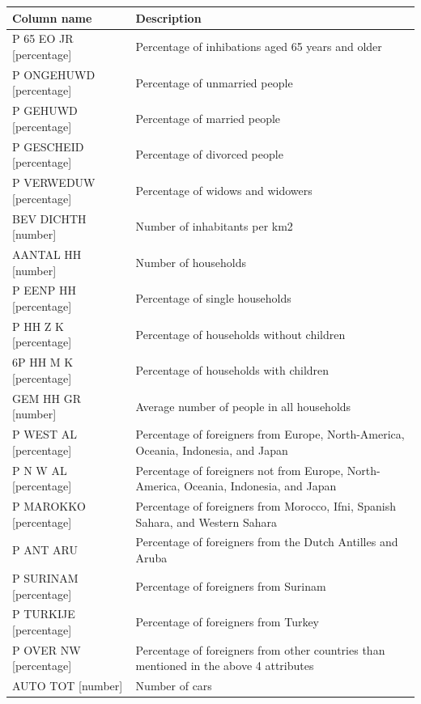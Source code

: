 \documentclass[a4paper,twoside,11pt]{article}
\begin{document}
\begin{center}
    \begin{tabular}{ | p{4.9cm} | p{10cm} |}
        \hline
        \textbf{Column name} & \textbf{Description} \\ \hline
        P 65 EO JR [percentage] & Percentage of inhibations aged 65 years and older \\ \hline
        P ONGEHUWD [percentage] & Percentage of unmarried people \\ \hline
        P GEHUWD [percentage] & Percentage of married people \\ \hline
        P GESCHEID [percentage] & Percentage of divorced people \\ \hline
        P VERWEDUW [percentage] & Percentage of widows and widowers \\ \hline
        BEV DICHTH [number] & Number of inhabitants per km2 \\ \hline
        AANTAL HH [number] & Number of households \\ \hline
        P EENP HH [percentage] & Percentage of single households \\ \hline
        P HH Z K [percentage] & Percentage of households without children \\ \hline
        6P HH M K [percentage] & Percentage of households with children \\ \hline
        GEM HH GR [number] & Average number of people in all households \\ \hline
        P WEST AL [percentage] & Percentage of foreigners from Europe, North-America, Oceania, Indonesia, and Japan \\ \hline
        P N W AL [percentage] & Percentage of foreigners not from Europe, North-America, Oceania, Indonesia, and Japan \\ \hline
        P MAROKKO [percentage] & Percentage of foreigners from Morocco, Ifni, Spanish Sahara, and Western Sahara \\ \hline
        P ANT ARU & Percentage of foreigners from the Dutch Antilles and Aruba \\ \hline
        P SURINAM [percentage] & Percentage of foreigners from Surinam \\ \hline
        P TURKIJE [percentage] & Percentage of foreigners from Turkey \\ \hline
        P OVER NW [percentage] & Percentage of foreigners from other countries than mentioned in the above 4 attributes \\ \hline
        AUTO TOT [number] & Number of cars \\ \hline

\end{tabular}
\end{center}
\end{document}
